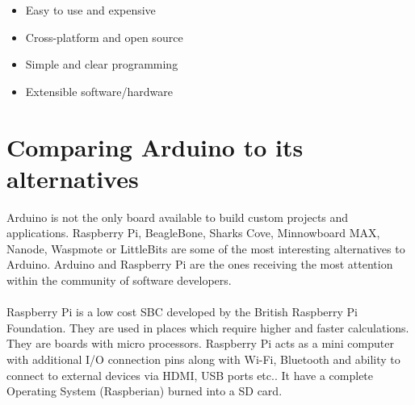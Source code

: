 \begin{itemize}
    \item Easy to use and expensive
    \item Cross-platform and open source
    \item Simple and clear programming
    
    
    \item  Extensible software/hardware
\end{itemize}   

\section{Comparing Arduino to its alternatives}
\par Arduino is not the only board available to build custom projects and applications. Raspberry Pi, BeagleBone, Sharks Cove, Minnowboard MAX, Nanode, Waspmote or LittleBits are some of the most interesting alternatives to Arduino. Arduino and Raspberry Pi are the ones receiving the most attention within the community of software developers.

\paragraph{ } Raspberry Pi is a low cost \ac{SBC} developed by the British Raspberry Pi Foundation. They are used in places which require higher and faster calculations. They are boards with micro processors. Raspberry Pi acts as a mini computer with additional I/O connection pins along with Wi-Fi, Bluetooth and ability to connect to external devices via HDMI, USB ports etc.. It have a complete Operating System (Raspberian) burned into a SD card. 

